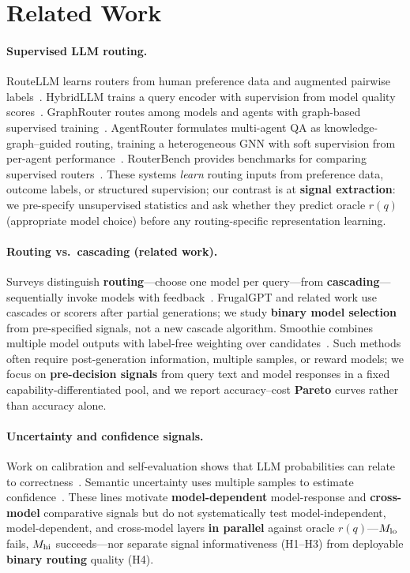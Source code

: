 \section{Related Work}
\label{sec:related}

\paragraph{Supervised LLM routing.}
RouteLLM learns routers from human preference data and augmented pairwise labels~\citep{ong2024routellm}.
HybridLLM trains a query encoder with supervision from model quality scores~\citep{ding2024hybrid}.
GraphRouter routes among models and agents with graph-based supervised training~\citep{feng2025graphrouter}.
AgentRouter formulates multi-agent QA as knowledge-graph--guided routing, training a heterogeneous GNN with soft supervision from per-agent performance~\citep{zhang2026agentrouter}.
RouterBench provides benchmarks for comparing supervised routers~\citep{hu2024routerbench}.
These systems \emph{learn} routing inputs from preference data, outcome labels, or structured supervision; our contrast is at \textbf{signal extraction}: we pre-specify unsupervised statistics and ask whether they predict oracle $r(q)$ (appropriate model choice) before any routing-specific representation learning.

\paragraph{Routing vs.\ cascading (related work).}
Surveys distinguish \textbf{routing}---choose one model per query---from \textbf{cascading}---sequentially invoke models with feedback~\citep{chen2024frugalgpt}.
FrugalGPT and related work use cascades or scorers after partial generations; we study \textbf{binary model selection} from pre-specified signals, not a new cascade algorithm.
Smoothie combines multiple model outputs with label-free weighting over candidates~\citep{guha2024smoothie}.
Such methods often require post-generation information, multiple samples, or reward models; we focus on \textbf{pre-decision signals} from query text and model responses in a fixed capability-differentiated pool, and we report accuracy--cost \textbf{Pareto} curves rather than accuracy alone.

\paragraph{Uncertainty and confidence signals.}
Work on calibration and self-evaluation shows that LLM probabilities can relate to correctness~\citep{kadavath2022know,plaut2024calibration,he2023calibration}.
Semantic uncertainty uses multiple samples to estimate confidence~\citep{kuhn2023semantic}.
These lines motivate \textbf{model-dependent} model-response and \textbf{cross-model} comparative signals but do not systematically test model-independent, model-dependent, and cross-model layers \textbf{in parallel} against oracle $r(q)$---$M_{\mathrm{lo}}$ fails, $M_{\mathrm{hi}}$ succeeds---nor separate signal informativeness (H1--H3) from deployable \textbf{binary routing} quality (H4).

